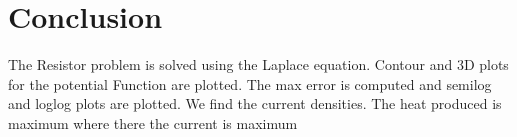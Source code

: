 \documentclass[12pt, a4paper]{report}
\begin{document}
\section{Conclusion}
The Resistor problem is solved using the Laplace equation. Contour and 3D plots for the potential Function are plotted. The max error is computed and semilog and loglog plots are plotted. We find the current densities. The heat produced is maximum where there the current is maximum
\end{document}
